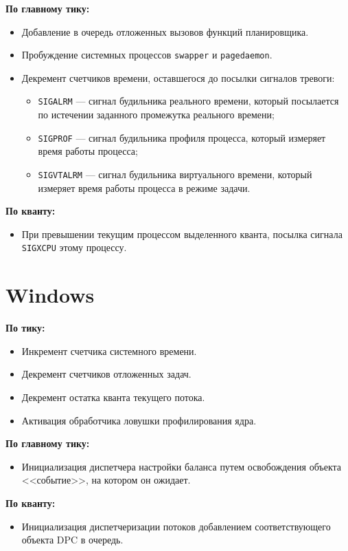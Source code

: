 \documentclass[a4paper,oneside,14pt]{extreport}
\newcommand{\code}[1]{\texttt{#1}}
\begin{document}
	\textbf{По главному тику:}
	\begin{itemize}
		\item Добавление в очередь отложенных вызовов функций планировщика.
		\item Пробуждение системных процессов \code{swapper} и \code{pagedaemon}.
		\item Декремент счетчиков времени, оставшегося до посылки сигналов тревоги:
		\begin{itemize}
			\item \code{SIGALRM} --- сигнал будильника реального времени, который посылается по истечении заданного промежутка реального времени;
			\item \code{SIGPROF} --- сигнал будильника профиля процесса, который измеряет время работы процесса;
			\item \code{SIGVTALRM} --- сигнал будильника виртуального времени, который измеряет время работы процесса в режиме задачи.
		\end{itemize}
	\end{itemize}
	
	\textbf{По кванту:}
	\begin{itemize}
		\item При превышении текущим процессом выделенного кванта, посылка сигнала \code{SIGXCPU} этому процессу.
	\end{itemize}
	
	\section{Windows}
	
	\textbf{По тику:}
	\begin{itemize}
		\item Инкремент счетчика системного времени.
		\item Декремент счетчиков отложенных задач.
		\item Декремент остатка кванта текущего потока.
		\item Активация обработчика ловушки профилирования ядра.
	\end{itemize}
	
	\textbf{По главному тику:}
	\begin{itemize}
		\item Инициализация диспетчера настройки баланса путем освобождения объекта <<событие>>, на котором он ожидает.
	\end{itemize}
	\textbf{По кванту:}
	\begin{itemize}
		\item Инициализация диспетчеризации потоков добавлением соответствующего объекта DPC в очередь.
	\end{itemize}
\end{document}
